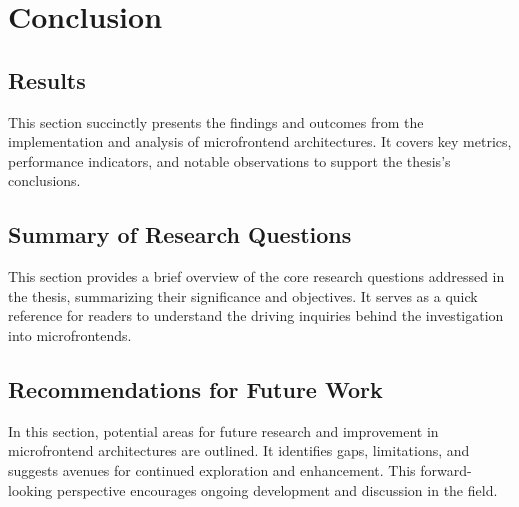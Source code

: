 \chapter{Conclusion}
\label{chap:Conclusion}

\section{Results}
This section succinctly presents the findings and outcomes from the implementation and analysis of microfrontend architectures. It covers key metrics, performance indicators, and notable observations to support the thesis's conclusions.

\section{Summary of Research Questions}
This section provides a brief overview of the core research questions addressed in the thesis, summarizing their significance and objectives. It serves as a quick reference for readers to understand the driving inquiries behind the investigation into microfrontends.

\section{Recommendations for Future Work}
In this section, potential areas for future research and improvement in microfrontend architectures are outlined. It identifies gaps, limitations, and suggests avenues for continued exploration and enhancement. This forward-looking perspective encourages ongoing development and discussion in the field.

\cite{Oetiker2000}